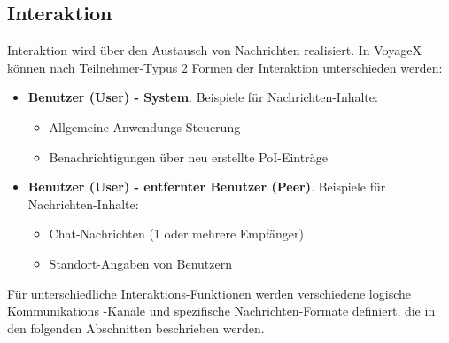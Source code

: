 
\subsection{Interaktion}\label{5_INTER}
Interaktion wird über den Austausch von Nachrichten realisiert. In VoyageX können nach Teilnehmer-Typus 2 Formen der Interaktion unterschieden werden:
\begin{itemize}
	\item \textbf{Benutzer (User) - System}. Beispiele für Nachrichten-Inhalte:
		\begin{itemize}
			\item Allgemeine Anwendungs-Steuerung
			\item Benachrichtigungen über neu erstellte PoI-Einträge
		\end{itemize}
	\item \textbf{Benutzer (User) - entfernter Benutzer (Peer)}. Beispiele für Nachrichten-Inhalte:
		\begin{itemize}
			\item Chat-Nachrichten (1 oder mehrere Empfänger)
			\item Standort-Angaben von Benutzern
		\end{itemize}
\end{itemize}
Für unterschiedliche Interaktions-Funktionen werden verschiedene logische Kommunikations -Kanäle und spezifische Nachrichten-Formate definiert, die in den folgenden Abschnitten beschrieben werden.

